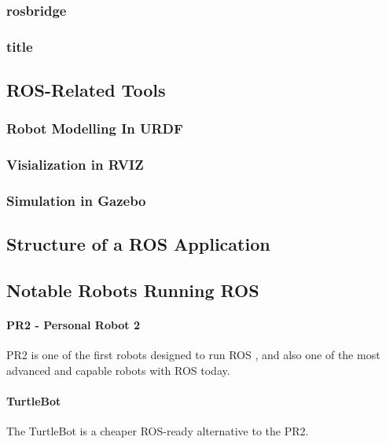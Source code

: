 \subsubsection{rosbridge}

\subsubsection{title}

\subsection{ROS-Related Tools}

\subsubsection{Robot Modelling In URDF}

\subsubsection{Visialization in RVIZ}

\subsubsection{Simulation in Gazebo}

\subsection{Structure of a ROS Application}

\subsection{Notable Robots Running ROS}

\paragraph{PR2 - Personal Robot 2}

PR2 is one of the first robots designed to run \ac{ROS} \cite{rosbook15}, and also one of the most advanced and capable robots with \ac{ROS} today. 

\paragraph{TurtleBot} 

The TurtleBot is a cheaper ROS-ready alternative to the PR2. 

